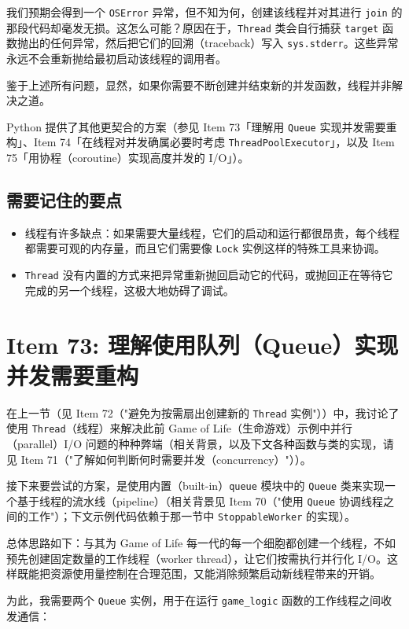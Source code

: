 我们预期会得到一个 \texttt{OSError} 异常，但不知为何，创建该线程并对其进行 \texttt{join} 的那段代码却毫发无损。这怎么可能？原因在于，\texttt{Thread} 类会自行捕获 \texttt{target} 函数抛出的任何异常，然后把它们的回溯（traceback）写入 \texttt{sys.stderr}。这些异常永远不会重新抛给最初启动该线程的调用者。

鉴于上述所有问题，显然，如果你需要不断创建并结束新的并发函数，线程并非解决之道。

Python 提供了其他更契合的方案（参见 Item 73「理解用 \texttt{Queue} 实现并发需要重构」、Item 74「在线程对并发确属必要时考虑 \texttt{ThreadPoolExecutor}」，以及 Item 75「用协程（coroutine）实现高度并发的 I/O」）。

\subsection{需要记住的要点}

\begin{itemize}
\item 线程有许多缺点：如果需要大量线程，它们的启动和运行都很昂贵，每个线程都需要可观的内存量，而且它们需要像 \texttt{Lock} 实例这样的特殊工具来协调。
\item \texttt{Thread} 没有内置的方式来把异常重新抛回启动它的代码，或抛回正在等待它完成的另一个线程，这极大地妨碍了调试。
\end{itemize}

\section{Item 73: 理解使用队列（Queue）实现并发需要重构}

在上一节（见 Item 72（"避免为按需扇出创建新的 \texttt{Thread} 实例"））中，我讨论了使用 \texttt{Thread}（线程）来解决此前 Game of Life（生命游戏）示例中并行（parallel）I/O 问题的种种弊端（相关背景，以及下文各种函数与类的实现，请见 Item 71（"了解如何判断何时需要并发（concurrency）"））。

接下来要尝试的方案，是使用内置（built-in）\texttt{queue} 模块中的 \texttt{Queue} 类来实现一个基于线程的流水线（pipeline）（相关背景见 Item 70（"使用 \texttt{Queue} 协调线程之间的工作"）；下文示例代码依赖于那一节中 \texttt{StoppableWorker} 的实现）。

总体思路如下：与其为 Game of Life 每一代的每一个细胞都创建一个线程，不如预先创建固定数量的工作线程（worker thread），让它们按需执行并行化 I/O。这样既能把资源使用量控制在合理范围，又能消除频繁启动新线程带来的开销。

为此，我需要两个 \texttt{Queue} 实例，用于在运行 \texttt{game\_logic} 函数的工作线程之间收发通信：

